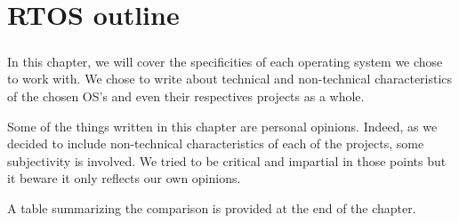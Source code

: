 \chapter{RTOS outline}

\paragraph{}
In this chapter, we will cover the specificities of each operating system we chose to work with.
We chose to write about technical and non-technical characteristics of the chosen OS's and even their respectives projects as a whole.

Some of the things written in this chapter are personal opinions.
Indeed, as we decided to include non-technical characteristics of each of the projects, some subjectivity is involved.
We tried to be critical and impartial in those points but it beware it only reflects our own opinions.


A table summarizing the comparison is provided at the end of the chapter.






